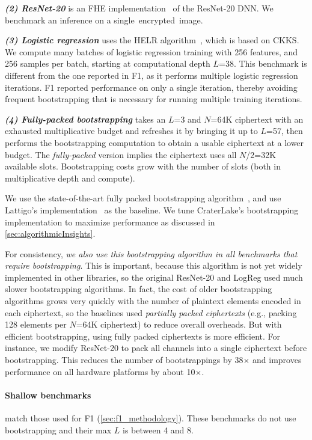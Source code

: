 \noindent \emph{\textbf{(2) ResNet-20}} is an FHE
implementation~\cite{lee:2021:privacy} of the ResNet-20 DNN. We benchmark an
inference on a single~encrypted~image.

\tblBenchmarksAndPerformanceBreakdown

\noindent \emph{\textbf{(3) Logistic regression}}
uses the HELR algorithm~\cite{han:aaai19:logistic}, which is based on CKKS. We
compute many batches of logistic regression training with 256 features, and 256
samples per batch, starting at computational depth $L$=38. This benchmark is
different from the one reported in F1, as it performs multiple logistic
regression iterations. F1 reported performance on only a single iteration,
thereby avoiding frequent bootstrapping that is necessary for running multiple
training iterations.

\noindent \emph{\textbf{(4) Fully-packed bootstrapping}}
takes an $L$=3 and $N$=64K ciphertext with an exhausted multiplicative budget
and refreshes it by bringing it up to $L$=57, then performs the bootstrapping
computation to obtain a usable ciphertext at a lower budget. The
\emph{fully-packed} version implies the ciphertext uses all $N$/2=32K available
slots. Bootstrapping costs grow with the number of slots (both in
multiplicative depth and compute).

We use the state-of-the-art fully packed bootstrapping
algorithm~\cite{mouchet2020lattigo}, and use Lattigo's
implementation~\cite{lattigo} as the baseline. We tune CraterLake's
bootstrapping implementation to maximize performance as discussed in
\autoref{sec:algorithmicInsights}.

For consistency, \emph{we also use this bootstrapping algorithm in all
benchmarks that require bootstrapping}. This is important, because this
algorithm is not yet widely implemented in other libraries, so the original
ResNet-20 and LogReg used much slower bootstrapping algorithms. In fact, the
cost of older bootstrapping algorithms grows very quickly with the number of
plaintext elements encoded in each ciphertext, so the baselines used
\emph{partially packed ciphertexts} (e.g., packing 128 elements per $N$=64K
ciphertext) to reduce overall overheads. But with efficient bootstrapping,
using fully packed ciphertexts is more efficient. For instance, we modify
ResNet-20 to pack all channels into a single ciphertext before bootstrapping.
This reduces the number of bootstrappings by 38$\times$ and improves
performance on all hardware platforms by about 10$\times$.

\paragraph{Shallow benchmarks} match those used for F1
(\autoref{sec:f1_methodology}). These benchmarks do not use bootstrapping and
their max $L$ is between 4 and 8.

